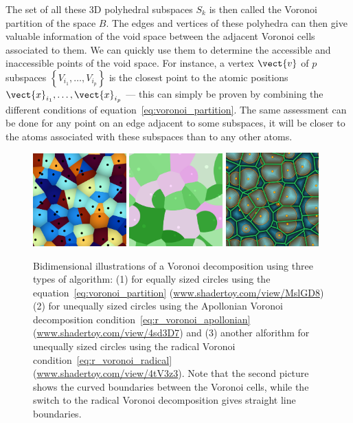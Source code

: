\documentclass[main]{subfiles}
\begin{document}
The set of all these 3D polyhedral subspaces $S_{k}$ is then called the Voronoi partition of the space $B$. The edges and vertices of these polyhedra can then give valuable information of the void space between the adjacent Voronoi cells associated to them. We can quickly use them to determine the accessible and inaccessible points of the void space. For instance, a vertex $\vect{v}$ of $p$ subspaces $\left\{V_{i_1},\ldots,V_{i_p}\right\}$ is the closest point to the atomic positions $\vect{x}_{i_1},\ldots,\vect{x}_{i_p}$ --- this can simply be proven by combining the different conditions of equation~\ref{eq:voronoi_partition}. The same assessment can be done for any point on an edge adjacent to some subspaces, it will be closer to the atoms associated with these subspaces than to any other atoms. 


\begin{figure}[ht]
  \centering
  \includegraphics[width=0.32\textwidth]{figures/3-fastsim/voronoi.jpg}
  \includegraphics[width=0.32\textwidth]{figures/3-fastsim/voronoi_apollonian.jpg}
  \includegraphics[width=0.32\textwidth]{figures/3-fastsim/voronoi_radical.jpg}
  \caption{Bidimensional illustrations of a Voronoi decomposition using three types of algorithm: (1) for equally sized circles using the equation~\ref{eq:voronoi_partition} (\url{www.shadertoy.com/view/MslGD8}) (2) for unequally sized circles using the Apollonian Voronoi decomposition condition~\ref{eq:r_voronoi_apollonian} (\url{www.shadertoy.com/view/4sd3D7}) and (3) another alforithm for unequally sized circles using the radical Voronoi condition~\ref{eq:r_voronoi_radical} (\url{www.shadertoy.com/view/4tV3z3}). Note that the second picture shows the curved boundaries between the Voronoi cells, while the switch to the radical Voronoi decomposition gives straight line boundaries.}\label{fgr:voronoi_illustration}
\end{figure}
\end{document}
